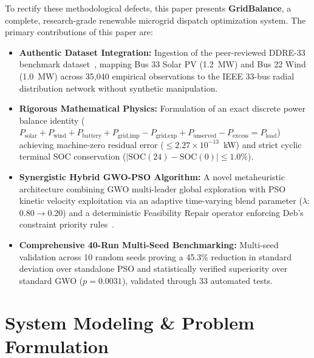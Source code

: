 \documentclass[conference]{IEEEtran}
\begin{document}
To rectify these methodological defects, this paper presents \textbf{GridBalance}, a complete, research-grade renewable microgrid dispatch optimization system. The primary contributions of this paper are:
\begin{itemize}
    \item \textbf{Authentic Dataset Integration:} Ingestion of the peer-reviewed DDRE-33 benchmark dataset~\cite{chen2025ddre33}, mapping Bus 33 Solar PV (1.2~MW) and Bus 22 Wind (1.0~MW) across 35,040 empirical observations to the IEEE 33-bus radial distribution network without synthetic manipulation.
    \item \textbf{Rigorous Mathematical Physics:} Formulation of an exact discrete power balance identity ($P_{\text{solar}} + P_{\text{wind}} + P_{\text{battery}} + P_{\text{grid,imp}} - P_{\text{grid,exp}} + P_{\text{unserved}} - P_{\text{excess}} = P_{\text{load}}$) achieving machine-zero residual error ($\le 2.27 \times 10^{-13}$~kW) and strict cyclic terminal SOC conservation ($|\text{SOC}(24) - \text{SOC}(0)| \le 1.0\%$).
    \item \textbf{Synergistic Hybrid GWO-PSO Algorithm:} A novel metaheuristic architecture combining GWO multi-leader global exploration with PSO kinetic velocity exploitation via an adaptive time-varying blend parameter ($\lambda$: $0.80 \to 0.20$) and a deterministic Feasibility Repair operator enforcing Deb's constraint priority rules~\cite{deb2000efficient}.
    \item \textbf{Comprehensive 40-Run Multi-Seed Benchmarking:} Multi-seed validation across 10 random seeds proving a 45.3\% reduction in standard deviation over standalone PSO and statistically verified superiority over standard GWO ($p = 0.0031$), validated through 33 automated tests.
\end{itemize}

\section{System Modeling \& Problem Formulation}
\end{document}
